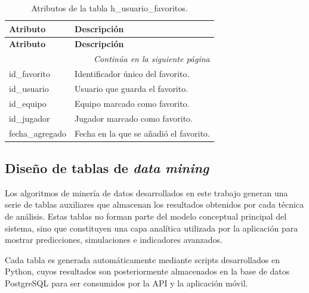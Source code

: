 \begin{longtable}{|l|l|}
\caption{Atributos de la tabla h\_usuario\_favoritos.} \\

\hline
\textbf{Atributo} & \textbf{Descripción} \\
\hline
\endfirsthead

\hline
\textbf{Atributo} & \textbf{Descripción} \\
\hline
\endhead

\hline
\multicolumn{2}{r}{\textit{Continúa en la siguiente página}} \\
\hline
\endfoot

\hline
\endlastfoot

id\_favorito & Identificador único del favorito. \\
id\_usuario & Usuario que guarda el favorito. \\
id\_equipo & Equipo marcado como favorito. \\
id\_jugador & Jugador marcado como favorito. \\
fecha\_agregado & Fecha en la que se añadió el favorito. \\
\hline

\end{longtable}

\subsection{Diseño de tablas de \textit{data mining}}

Los algoritmos de minería de datos desarrollados en este trabajo generan una serie de tablas auxiliares que almacenan los resultados obtenidos por cada técnica de análisis. Estas tablas no forman parte del modelo conceptual principal del sistema, sino que constituyen una capa analítica utilizada por la aplicación para mostrar predicciones, simulaciones e indicadores avanzados.

Cada tabla es generada automáticamente mediante scripts desarrollados en Python, cuyos resultados son posteriormente almacenados en la base de datos PostgreSQL para ser consumidos por la API y la aplicación móvil.

